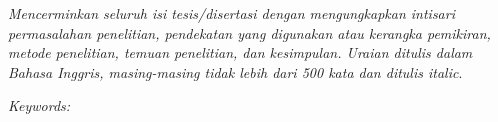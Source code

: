 \noindent \textit{Mencerminkan seluruh isi tesis/disertasi dengan mengungkapkan
intisari permasalahan penelitian, pendekatan yang digunakan atau
kerangka pemikiran, metode penelitian, temuan penelitian, dan
kesimpulan. Uraian ditulis dalam Bahasa Inggris, masing-masing tidak lebih dari 500 kata dan ditulis italic}.

\vspace{5mm}

\noindent \textit{Keywords:} 